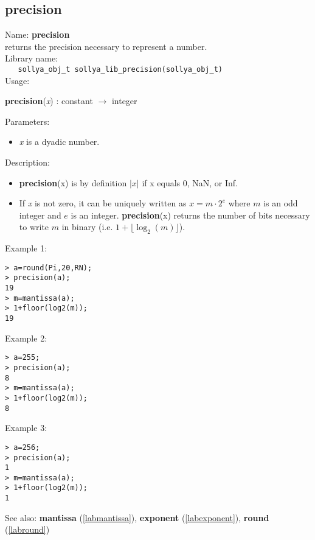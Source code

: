 \subsection{precision}
\label{labprecision}
\noindent Name: \textbf{precision}\\
\phantom{aaa}returns the precision necessary to represent a number.\\[0.2cm]
\noindent Library name:\\
\verb|   sollya_obj_t sollya_lib_precision(sollya_obj_t)|\\[0.2cm]
\noindent Usage: 
\begin{center}
\textbf{precision}(\emph{x}) : \textsf{constant} $\rightarrow$ \textsf{integer}\\
\end{center}
Parameters: 
\begin{itemize}
\item \emph{x} is a dyadic number.
\end{itemize}
\noindent Description: \begin{itemize}

\item \textbf{precision}(x) is by definition $\vert x \vert$ if x equals 0, NaN, or Inf.

\item If \emph{x} is not zero, it can be uniquely written as $x = m \cdot 2^e$ where
   $m$ is an odd integer and $e$ is an integer. \textbf{precision}(x) returns the number
   of bits necessary to write $m$ in binary (i.e. $1+ \lfloor \log_2(m) \rfloor$).
\end{itemize}
\noindent Example 1: 
\begin{center}\begin{minipage}{15cm}\begin{Verbatim}[frame=single,commandchars=\\\|\~]
> a=round(Pi,20,RN);
> precision(a);
19
> m=mantissa(a);
> 1+floor(log2(m));
19
\end{Verbatim}
\end{minipage}\end{center}
\noindent Example 2: 
\begin{center}\begin{minipage}{15cm}\begin{Verbatim}[frame=single,commandchars=\\\|\~]
> a=255;
> precision(a);
8
> m=mantissa(a);
> 1+floor(log2(m));
8
\end{Verbatim}
\end{minipage}\end{center}
\noindent Example 3: 
\begin{center}\begin{minipage}{15cm}\begin{Verbatim}[frame=single,commandchars=\\\|\~]
> a=256;
> precision(a);
1
> m=mantissa(a);
> 1+floor(log2(m));
1
\end{Verbatim}
\end{minipage}\end{center}
See also: \textbf{mantissa} (\ref{labmantissa}), \textbf{exponent} (\ref{labexponent}), \textbf{round} (\ref{labround})
